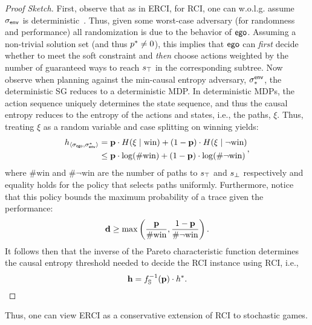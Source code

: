\begin{proof}[Proof Sketch]
  First, observe that as in ERCI, for RCI, one can w.o.l.g. assume
  ${\sigma_{\mathsf{env}}}$ is deterministic~\cite{DBLP:conf/cav/FremontS18}.
  Thus, given some worst-case adversary (for randomness and
  performance) all randomization is due to the behavior of
  $\mathsf{ego}$. Assuming a non-trivial solution set (and thus
  $p^{*} \neq 0$), this implies that $\mathsf{ego}$ can \emph{first} decide
  whether to meet the soft constraint and \emph{then} choose actions
  weighted by the number of guaranteed ways to reach $s_{\top}$ in the
  corresponding subtree. Now observe when planning against the
  min-causal entropy adversary, $\sigma_*^{\mathsf{env}}$, the deterministic SG
  reduces to a deterministic MDP. In deterministic MDPs, the action
  sequence uniquely determines the state sequence, and thus the causal
  entropy reduces to the entropy of the actions and states, i.e., the
  paths, $\xi$.  Thus, treating $\xi$ as a random variable and
  case splitting on winning yields:
  \begin{equation}\label{eq:cond_win}
    \begin{split}
      h_{\langle \sched_\pOne, \sched^*_\pTwo\rangle} &= \scthreshold\cdot H(\xi \mid \text{win}) + (1 - \scthreshold)\cdot H(\xi \mid \neg \text{win})\\
      &\leq \scthreshold\cdot \log(\#\text{win}) + (1 - \scthreshold)\cdot \log(\#\neg
      \text{win})
    \end{split},
  \end{equation}
  where $\#\text{win}$ and $\#\neg \text{win}$ are the
  number of paths to $s_{\top}$ and $s_{\bot}$ respectively and equality holds
  for the policy that selects paths uniformly. Furthermore, notice that this policy
  bounds the maximum probability of a trace given the performance:
  \begin{equation}
    \mathbf{d} \geq \max\left(\frac{\mathbf{p}}{\#\text{win}}, \frac{ 1- \mathbf{p}}{\#\neg \text{win}}\right).
  \end{equation}
  It follows then that the inverse of the Pareto characteristic
  function determines the causal entropy threshold needed to decide the RCI instance
  using RCI, i.e.,
  \begin{equation}
    \mathbf{h} = f_\mathbb{S}^{-1}(\mathbf{p}) \cdot h^*.
  \end{equation}
\end{proof}
Thus, one can view ERCI as a conservative extension of RCI to stochastic games.


